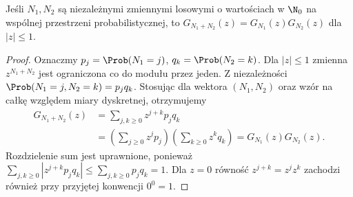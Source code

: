 \begin{twierdzenie}
Jeśli $N_1,N_2$ są niezależnymi zmiennymi losowymi
o wartościach w $\N_0$ na wspólnej przestrzeni
probabilistycznej, to $G_{N_1+N_2}(z)=G_{N_1}(z)G_{N_2}(z)$
dla $|z|\leq1$.
\end{twierdzenie}
\begin{proof}
Oznaczmy $p_j=\Prob(N_1=j)$, $q_k=\Prob(N_2=k)$.
Dla $|z|\leq1$ zmienna $z^{N_1+N_2}$ jest ograniczona
co do modułu przez jeden. Z niezależności
$\Prob(N_1=j,N_2=k)=p_jq_k$.
Stosując 
dla wektora $(N_1,N_2)$ oraz wzór na całkę względem
miary dyskretnej, otrzymujemy
\[
\begin{aligned}
G_{N_1+N_2}(z)
&=\sum_{j,k\geq0}z^{j+k}p_jq_k\\
&=\left(\sum_{j\geq0}z^jp_j\right)
  \left(\sum_{k\geq0}z^kq_k\right)
=G_{N_1}(z)G_{N_2}(z).
\end{aligned}
\]
Rozdzielenie sum jest uprawnione, ponieważ
$\sum_{j,k\geq0}|z^{j+k}p_jq_k|\leq
\sum_{j,k\geq0}p_jq_k=1$.
Dla $z=0$ równość $z^{j+k}=z^jz^k$ zachodzi również
przy przyjętej konwencji $0^0=1$.
\end{proof}


